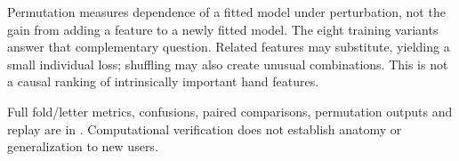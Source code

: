 Permutation measures dependence of a fitted model under perturbation, not the gain from adding a feature to a newly fitted model. The eight training variants answer that complementary question. Related features may substitute, yielding a small individual loss; shuffling may also create unusual combinations. This is not a causal ranking of intrinsically important hand features.

Full fold/letter metrics, confusions, paired comparisons, permutation outputs and replay are in . Computational verification does not establish anatomy or generalization to new users.
